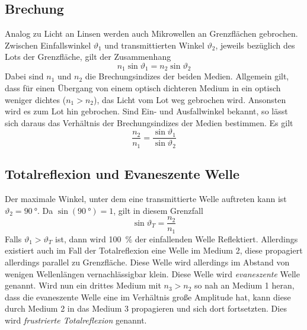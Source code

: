 \subsection{Brechung}
Analog zu Licht an Linsen werden auch Mikrowellen an Grenzflächen gebrochen. Zwischen Einfallswinkel $ \vartheta_1 $ und transmittierten Winkel $ \vartheta_2 $, jeweils bezüglich des Lots der Grenzfläche, gilt der Zusammenhang
\begin{equation}
	n_{1}\sin \vartheta_{1}=n_{2}\sin\vartheta_{2}
\end{equation}
Dabei sind $ n_1 $ und $ n_2 $ die Brechungsindizes der beiden Medien. Allgemein gilt, dass für einen Übergang von einem optisch dichteren Medium in ein optisch weniger dichtes ($ n_1 > n_2 $), das Licht vom Lot weg gebrochen wird. Ansonsten wird es zum Lot hin gebrochen. Sind Ein- und Ausfallwinkel bekannt, so lässt sich daraus das Verhältnis der Brechungsindizes der Medien bestimmen. Es gilt
\begin{equation}
	\frac{n_2}{n_1} = \frac{\sin \vartheta_1}{\sin\vartheta_2} \label{eq:n}
\end{equation}
\subsection{Totalreflexion und Evaneszente Welle}
Der maximale Winkel, unter dem eine transmittierte Welle auftreten kann ist $ \vartheta_2 = \SI{90}{\degree} $. Da $ \sin(\SI{90}{\degree}) = 1 $, gilt in diesem Grenzfall
\begin{equation}
\sin\vartheta_{T}=\frac{n_{2}}{n_{1}}
\end{equation}
Falls $ \vartheta_{1}>\vartheta_{T} $ ist, dann wird \SI{100}{\percent} der einfallenden Welle Reflektiert.
Allerdings existiert auch im Fall der Totalreflexion eine Welle im Medium 2, diese propagiert allerdings parallel zu Grenzfläche. Diese Welle wird allerdings im Abstand von wenigen Wellenlängen vernachlässigbar klein. Diese Welle wird \textit{evaneszente} Welle genannt.
Wird nun ein drittes Medium mit $ n_{3}>n_{2} $ so nah an Medium 1 heran, dass die evaneszente Welle eine im Verhältnis große Amplitude hat, kann diese durch Medium 2 in das Medium 3 propagieren und sich dort fortsetzten. Dies wird \textit{frustrierte Totalreflexion} genannt.

